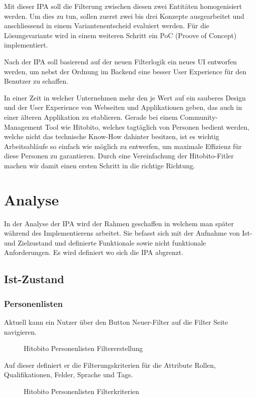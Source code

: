 Mit dieser IPA soll die Filterung zwischen diesen zwei Entitäten homogenisiert werden. Um dies zu tun,
sollen zuerst zwei bis drei Konzepte ausgearbeitet und anschliessend in einem Variantenentscheid evaluiert werden. Für die Lösungsvariante wird in einem weiteren Schritt ein PoC (Proove of Concept) implementiert. 

Nach der IPA soll basierend auf der neuen Filterlogik ein neues UI entworfen werden, um nebst der Ordnung im Backend
eine besser User Experience für den Benutzer zu schaffen.

In einer Zeit in welcher Unternehmen mehr den je Wert auf ein sauberes Design und der User Experience von Webseiten und Applikationen geben, das auch
in einer älteren Applikation zu etablieren. Gerade bei einem Community-Management Tool wie Hitobito, welches tagtäglich von 
Personen bedient werden, welche nicht das technische Know-How dahinter besitzen, ist es wichtig Arbeitsabläufe so einfach wie möglich zu entwerfen, um 
maximale Effizienz für diese Personen zu garantieren. Durch eine Vereinfachung der Hitobito-Fitler machen wir damit einen ersten Schritt in die richtige
Richtung.

\chapter{Analyse}
In der Analyse der IPA wird der Rahmen geschaffen in welchem man später während des Implementierens arbeitet. 
Sie befasst sich mit der Aufnahme von Ist- und Zielzustand und definierte Funktionale sowie nicht funktionale Anforderungen.
Es wird definiert wo sich die IPA abgrenzt. 

\section{Ist-Zustand}

\subsection{Personenlisten}
Aktuell kann ein Nutzer über den Button Neuer-Filter auf die Filter Seite navigieren. 
\begin{figure}[h]
   \centering
   \caption{Hitobito Personenlisten Filtererstellung}
\end{figure}

\newpage 

Auf dieser definiert er die Filterungskriterien für die Attribute Rollen, Qualifikationen,
Felder, Sprache und Tags. 
\begin{figure}[h]
   \centering
   \caption{Hitobito Personenlisten Filterkriterien}
\end{figure}

